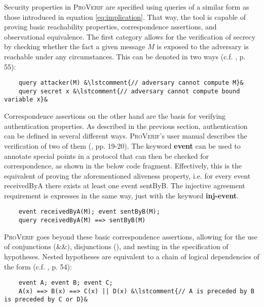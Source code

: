 Security properties in \textsc{ProVerif} are specified using queries of a similar form as those introduced in equation \ref{eq:implication}.
That way, the tool is capable of proving basic reachability properties, correspondence assertions, and observational equivalence.
The first category allows for the verification of secrecy by checking whether the fact a given message $M$ is exposed to the adversary is reachable under any circumstances.
This can be denoted in two ways (c.f. \cite{blanchet2020proverif}, p. 55):

\begin{lstlisting}
    query attacker(M) &\lstcomment{// adversary cannot compute M}&
    query secret x &\lstcomment{// adversary cannot compute bound variable x}&
\end{lstlisting}

Correspondence assertions on the other hand are the basis for verifying authentication properties.
As described in the previous section, authentication can be defined in several different ways.
\textsc{ProVerif}'s user manual describes the verification of two of them (\cite{blanchet2020proverif}, pp. 19-20).
The keyword \textsf{\textbf{event}} can be used to annotate special points in a protocol that can then be checked for correspondence, as shown in the below code fragment.
Effectively, this is the equivalent of proving the aforementioned aliveness property, i.e. for every event \textsf{receivedByA} there exists at least one event \textsf{sentByB}.
The injective agreement requirement is expresses in the same way, just with the keyword \textsf{\textbf{inj-event}}.

\begin{lstlisting}
    event receivedByA(M); event sentByB(M);
    query receivedByA(M) ==> sentByB(M)
\end{lstlisting}

\noindent
\textsc{ProVerif} goes beyond these basic correspondence assertions, allowing for the use of conjunctions (\textsf{\&\&}), disjunctions (\textsf{\textbar\textbar}), and nesting in the specification of hypotheses.
Nested hypotheses are equivalent to a chain of logical dependencies of the form (c.f. \cite{blanchet2020proverif}, p. 54):

\begin{lstlisting}
    event A; event B; event C;
    A(x) ==> B(x) ==> C(x) || D(x) &\lstcomment{// A is preceded by B is preceded by C or D}&
\end{lstlisting}


